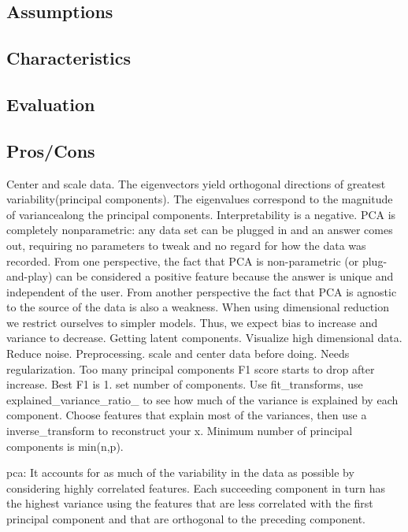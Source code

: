 \documentclass[]{book}
\theoremstyle{definition}
\theoremstyle{definition}
\theoremstyle{definition}
\theoremstyle{remark}
\begin{document}
\subsection{Assumptions}\label{assumptions-5}

\subsection{Characteristics}\label{characteristics-5}

\subsection{Evaluation}\label{evaluation-5}

\subsection{Pros/Cons}\label{proscons-5}

Center and scale data. The eigenvectors yield orthogonal directions of
greatest variability(principal components). The eigenvalues correspond
to the magnitude of variancealong the principal components.
Interpretability is a negative. PCA is completely nonparametric: any
data set can be plugged in and an answer comes out, requiring no
parameters to tweak and no regard for how the data was recorded. From
one perspective, the fact that PCA is non-parametric (or plug-and-play)
can be considered a positive feature because the answer is unique and
independent of the user. From another perspective the fact that PCA is
agnostic to the source of the data is also a weakness. When using
dimensional reduction we restrict ourselves to simpler models. Thus, we
expect bias to increase and variance to decrease. Getting latent
components. Visualize high dimensional data. Reduce noise.
Preprocessing. scale and center data before doing. Needs regularization.
Too many principal components F1 score starts to drop after increase.
Best F1 is 1. set number of components. Use fit\_transforms, use
explained\_variance\_ratio\_ to see how much of the variance is
explained by each component. Choose features that explain most of the
variances, then use a inverse\_transform to reconstruct your x. Minimum
number of principal components is min(n,p).

pca: It accounts for as much of the variability in the data as possible
by considering highly correlated features. Each succeeding component in
turn has the highest variance using the features that are less
correlated with the first principal component and that are orthogonal to
the preceding component.
\end{document}
